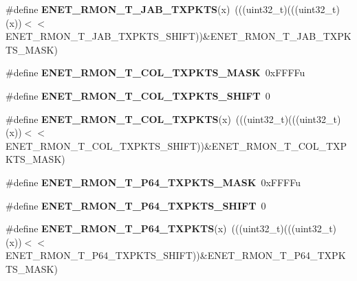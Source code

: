 \begin{DoxyCompactItemize}
\item 
\#define {\bfseries E\+N\+E\+T\+\_\+\+R\+M\+O\+N\+\_\+\+T\+\_\+\+J\+A\+B\+\_\+\+T\+X\+P\+K\+TS}(x)~(((uint32\+\_\+t)(((uint32\+\_\+t)(x))$<$$<$E\+N\+E\+T\+\_\+\+R\+M\+O\+N\+\_\+\+T\+\_\+\+J\+A\+B\+\_\+\+T\+X\+P\+K\+T\+S\+\_\+\+S\+H\+I\+FT))\&E\+N\+E\+T\+\_\+\+R\+M\+O\+N\+\_\+\+T\+\_\+\+J\+A\+B\+\_\+\+T\+X\+P\+K\+T\+S\+\_\+\+M\+A\+SK)\hypertarget{group__ENET__Register__Masks_ga708fa1bfbc3cf03da5b4beb7a24b8e67}{}\label{group__ENET__Register__Masks_ga708fa1bfbc3cf03da5b4beb7a24b8e67}

\item 
\#define {\bfseries E\+N\+E\+T\+\_\+\+R\+M\+O\+N\+\_\+\+T\+\_\+\+C\+O\+L\+\_\+\+T\+X\+P\+K\+T\+S\+\_\+\+M\+A\+SK}~0x\+F\+F\+F\+Fu\hypertarget{group__ENET__Register__Masks_ga2acdc948ff9f17ae66ed9efd053cf3f4}{}\label{group__ENET__Register__Masks_ga2acdc948ff9f17ae66ed9efd053cf3f4}

\item 
\#define {\bfseries E\+N\+E\+T\+\_\+\+R\+M\+O\+N\+\_\+\+T\+\_\+\+C\+O\+L\+\_\+\+T\+X\+P\+K\+T\+S\+\_\+\+S\+H\+I\+FT}~0\hypertarget{group__ENET__Register__Masks_ga04f557da802770a52c52f3e7eda944de}{}\label{group__ENET__Register__Masks_ga04f557da802770a52c52f3e7eda944de}

\item 
\#define {\bfseries E\+N\+E\+T\+\_\+\+R\+M\+O\+N\+\_\+\+T\+\_\+\+C\+O\+L\+\_\+\+T\+X\+P\+K\+TS}(x)~(((uint32\+\_\+t)(((uint32\+\_\+t)(x))$<$$<$E\+N\+E\+T\+\_\+\+R\+M\+O\+N\+\_\+\+T\+\_\+\+C\+O\+L\+\_\+\+T\+X\+P\+K\+T\+S\+\_\+\+S\+H\+I\+FT))\&E\+N\+E\+T\+\_\+\+R\+M\+O\+N\+\_\+\+T\+\_\+\+C\+O\+L\+\_\+\+T\+X\+P\+K\+T\+S\+\_\+\+M\+A\+SK)\hypertarget{group__ENET__Register__Masks_ga0e3dd240f2ffd82851fe62e850caa39a}{}\label{group__ENET__Register__Masks_ga0e3dd240f2ffd82851fe62e850caa39a}

\item 
\#define {\bfseries E\+N\+E\+T\+\_\+\+R\+M\+O\+N\+\_\+\+T\+\_\+\+P64\+\_\+\+T\+X\+P\+K\+T\+S\+\_\+\+M\+A\+SK}~0x\+F\+F\+F\+Fu\hypertarget{group__ENET__Register__Masks_ga1db32099fbc7f82b96894eceb27fadc7}{}\label{group__ENET__Register__Masks_ga1db32099fbc7f82b96894eceb27fadc7}

\item 
\#define {\bfseries E\+N\+E\+T\+\_\+\+R\+M\+O\+N\+\_\+\+T\+\_\+\+P64\+\_\+\+T\+X\+P\+K\+T\+S\+\_\+\+S\+H\+I\+FT}~0\hypertarget{group__ENET__Register__Masks_gac06c1d984f1ef4f7fe433830c0c45398}{}\label{group__ENET__Register__Masks_gac06c1d984f1ef4f7fe433830c0c45398}

\item 
\#define {\bfseries E\+N\+E\+T\+\_\+\+R\+M\+O\+N\+\_\+\+T\+\_\+\+P64\+\_\+\+T\+X\+P\+K\+TS}(x)~(((uint32\+\_\+t)(((uint32\+\_\+t)(x))$<$$<$E\+N\+E\+T\+\_\+\+R\+M\+O\+N\+\_\+\+T\+\_\+\+P64\+\_\+\+T\+X\+P\+K\+T\+S\+\_\+\+S\+H\+I\+FT))\&E\+N\+E\+T\+\_\+\+R\+M\+O\+N\+\_\+\+T\+\_\+\+P64\+\_\+\+T\+X\+P\+K\+T\+S\+\_\+\+M\+A\+SK)\hypertarget{group__ENET__Register__Masks_gabad226cdad5fe7803f060d4379980bd2}{}\label{group__ENET__Register__Masks_gabad226cdad5fe7803f060d4379980bd2}


\end{DoxyCompactItemize}
